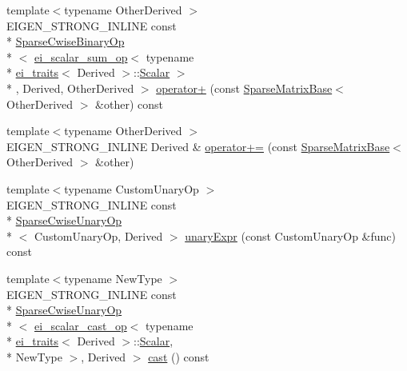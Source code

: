 \begin{DoxyCompactItemize}
\item 
{\footnotesize template$<$typename Other\-Derived $>$ }\\E\-I\-G\-E\-N\-\_\-\-S\-T\-R\-O\-N\-G\-\_\-\-I\-N\-L\-I\-N\-E const \\*
\hyperlink{class_sparse_cwise_binary_op}{Sparse\-Cwise\-Binary\-Op}\\*
$<$ \hyperlink{structei__scalar__sum__op}{ei\-\_\-scalar\-\_\-sum\-\_\-op}$<$ typename \\*
\hyperlink{structei__traits}{ei\-\_\-traits}$<$ Derived $>$\-::\hyperlink{class_sparse_matrix_base_af39d70f2b7e775e9e17b666cd24128c8}{Scalar} $>$\\*
, Derived, Other\-Derived $>$ \hyperlink{class_sparse_matrix_base_aeff063ac2790d84811862f2e3e81619e}{operator+} (const \hyperlink{class_sparse_matrix_base}{Sparse\-Matrix\-Base}$<$ Other\-Derived $>$ \&other) const 
\item 
{\footnotesize template$<$typename Other\-Derived $>$ }\\E\-I\-G\-E\-N\-\_\-\-S\-T\-R\-O\-N\-G\-\_\-\-I\-N\-L\-I\-N\-E Derived \& \hyperlink{class_sparse_matrix_base_a22e242f610293f23e52624fb58d78dcf}{operator+=} (const \hyperlink{class_sparse_matrix_base}{Sparse\-Matrix\-Base}$<$ Other\-Derived $>$ \&other)
\item 
{\footnotesize template$<$typename Custom\-Unary\-Op $>$ }\\E\-I\-G\-E\-N\-\_\-\-S\-T\-R\-O\-N\-G\-\_\-\-I\-N\-L\-I\-N\-E const \\*
\hyperlink{class_sparse_cwise_unary_op}{Sparse\-Cwise\-Unary\-Op}\\*
$<$ Custom\-Unary\-Op, Derived $>$ \hyperlink{class_sparse_matrix_base_aadf309c7d45d5f370fe30f0af5b8dd43}{unary\-Expr} (const Custom\-Unary\-Op \&func) const 
\item 
{\footnotesize template$<$typename New\-Type $>$ }\\E\-I\-G\-E\-N\-\_\-\-S\-T\-R\-O\-N\-G\-\_\-\-I\-N\-L\-I\-N\-E const \\*
\hyperlink{class_sparse_cwise_unary_op}{Sparse\-Cwise\-Unary\-Op}\\*
$<$ \hyperlink{structei__scalar__cast__op}{ei\-\_\-scalar\-\_\-cast\-\_\-op}$<$ typename \\*
\hyperlink{structei__traits}{ei\-\_\-traits}$<$ Derived $>$\-::\hyperlink{class_sparse_matrix_base_af39d70f2b7e775e9e17b666cd24128c8}{Scalar}, \\*
New\-Type $>$, Derived $>$ \hyperlink{class_sparse_matrix_base_a5990cb84501603804f9a34bcf79e0aff}{cast} () const 

\end{DoxyCompactItemize}
